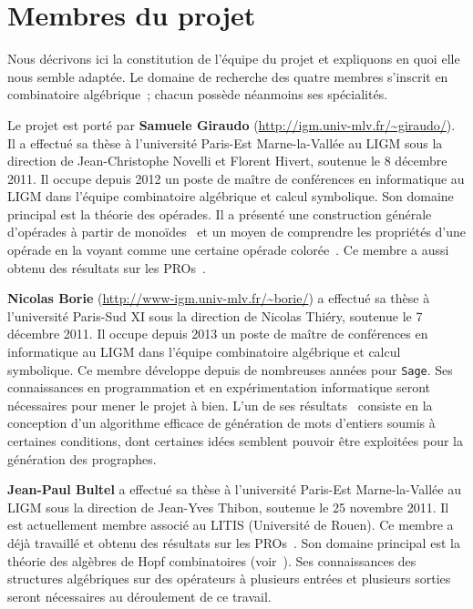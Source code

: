 \documentclass[10pt,reqno]{amsart}
\numberwithin{equation}{subsection}
\begin{document}
\section{Membres du projet}
Nous décrivons ici la constitution de l'équipe du projet et expliquons
en quoi elle nous semble adaptée. Le domaine de recherche des quatre 
membres s'inscrit en combinatoire algébrique~; chacun possède néanmoins 
ses spécialités.

Le projet est porté par {\bf Samuele Giraudo}
(\url{http://igm.univ-mlv.fr/~giraudo/}). Il a effectué sa thèse à
l'université Paris-Est Marne-la-Vallée au LIGM sous la direction de
Jean-Christophe Novelli et Florent Hivert, soutenue le 8 décembre 2011.
Il occupe depuis 2012 un poste de maître de conférences en informatique
au LIGM dans l'équipe combinatoire algébrique et calcul symbolique. Son
domaine principal est la théorie des opérades. Il a présenté
une construction générale d'opérades à partir de monoïdes~\cite{Gir15} 
et un moyen de comprendre les propriétés d'une opérade en la voyant 
comme une certaine opérade colorée~\cite{CG14}. Ce membre a aussi obtenu 
des résultats sur les PROs~\cite{BG14}. 


{\bf Nicolas Borie} (\url{http://www-igm.univ-mlv.fr/~borie/}) a effectué
sa thèse à l'université Paris-Sud XI sous la direction de Nicolas
Thiéry, soutenue le 7 décembre 2011. Il occupe depuis 2013 un poste de
maître de conférences en informatique au LIGM dans l'équipe combinatoire
algébrique et calcul symbolique. Ce membre développe depuis de nombreuses
années pour \texttt{Sage}. Ses connaissances en programmation et en
expérimentation informatique seront nécessaires pour mener le projet à
bien. L'un de ses résultats~\cite{Bor13} consiste en la conception d'un
algorithme efficace de génération de mots d'entiers soumis à certaines
conditions, dont certaines idées semblent pouvoir être exploitées pour
la génération des prographes. 


{\bf Jean-Paul Bultel} a effectué sa thèse à l'université Paris-Est
Marne-la-Vallée au LIGM sous la direction de Jean-Yves Thibon, soutenue
le 25 novembre 2011. Il est actuellement membre associé au LITIS 
(Université de Rouen). Ce membre a déjà travaillé et obtenu des
résultats sur les PROs~\cite{BG14}. Son domaine principal est la théorie
des algèbres de Hopf combinatoires (voir~\cite{Bul11}). Ses connaissances
des structures algébriques sur des opérateurs à plusieurs entrées et
plusieurs sorties seront nécessaires au déroulement de ce travail.
\end{document}
